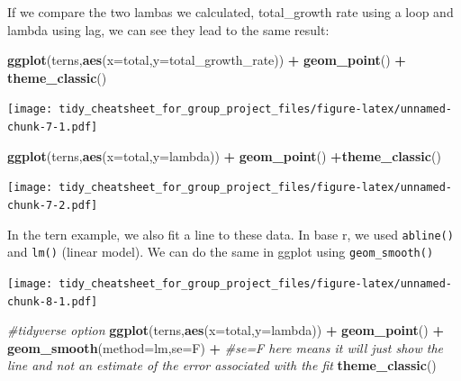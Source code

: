 \documentclass[
]{article}
\newenvironment{Shaded}{\begin{snugshade}}{\end{snugshade}}
\newcommand{\AttributeTok}[1]{\textcolor[rgb]{0.13,0.29,0.53}{#1}}
\newcommand{\CommentTok}[1]{\textcolor[rgb]{0.56,0.35,0.01}{\textit{#1}}}
\newcommand{\FunctionTok}[1]{\textcolor[rgb]{0.13,0.29,0.53}{\textbf{#1}}}
\newcommand{\NormalTok}[1]{#1}
\newcommand{\SpecialCharTok}[1]{\textcolor[rgb]{0.81,0.36,0.00}{\textbf{#1}}}
\newcommand{\StringTok}[1]{\textcolor[rgb]{0.31,0.60,0.02}{#1}}
\begin{document}
If we compare the two lambas we calculated, total\_growth rate using a
loop and lambda using lag, we can see they lead to the same result:

\begin{Shaded}
\begin{Highlighting}[]
\FunctionTok{ggplot}\NormalTok{(terns,}\FunctionTok{aes}\NormalTok{(}\AttributeTok{x=}\NormalTok{total,}\AttributeTok{y=}\NormalTok{total\_growth\_rate)) }\SpecialCharTok{+}
  \FunctionTok{geom\_point}\NormalTok{() }\SpecialCharTok{+} \FunctionTok{theme\_classic}\NormalTok{()}
\end{Highlighting}
\end{Shaded}

\texttt{[image: tidy\_cheatsheet\_for\_group\_project\_files/figure-latex/unnamed-chunk-7-1.pdf]}

\begin{Shaded}
\begin{Highlighting}[]
\FunctionTok{ggplot}\NormalTok{(terns,}\FunctionTok{aes}\NormalTok{(}\AttributeTok{x=}\NormalTok{total,}\AttributeTok{y=}\NormalTok{lambda)) }\SpecialCharTok{+}
  \FunctionTok{geom\_point}\NormalTok{() }\SpecialCharTok{+}\FunctionTok{theme\_classic}\NormalTok{()}
\end{Highlighting}
\end{Shaded}

\texttt{[image: tidy\_cheatsheet\_for\_group\_project\_files/figure-latex/unnamed-chunk-7-2.pdf]}

In the tern example, we also fit a line to these data. In base r, we
used \texttt{abline()} and \texttt{lm()} (linear model). We can do the
same in ggplot using \texttt{geom\_smooth()}

\begin{Shaded}
\end{Shaded}

\texttt{[image: tidy\_cheatsheet\_for\_group\_project\_files/figure-latex/unnamed-chunk-8-1.pdf]}

\begin{Shaded}
\begin{Highlighting}[]
\CommentTok{\#tidyverse option}
\FunctionTok{ggplot}\NormalTok{(terns,}\FunctionTok{aes}\NormalTok{(}\AttributeTok{x=}\NormalTok{total,}\AttributeTok{y=}\NormalTok{lambda)) }\SpecialCharTok{+}
  \FunctionTok{geom\_point}\NormalTok{() }\SpecialCharTok{+}
  \FunctionTok{geom\_smooth}\NormalTok{(}\AttributeTok{method=}\StringTok{\textquotesingle{}lm\textquotesingle{}}\NormalTok{,}\AttributeTok{se=}\NormalTok{F) }\SpecialCharTok{+} \CommentTok{\#se=F here means it will just show the line and not an estimate of the error associated with the fit}
  \FunctionTok{theme\_classic}\NormalTok{()}
\end{Highlighting}
\end{Shaded}
\end{document}

